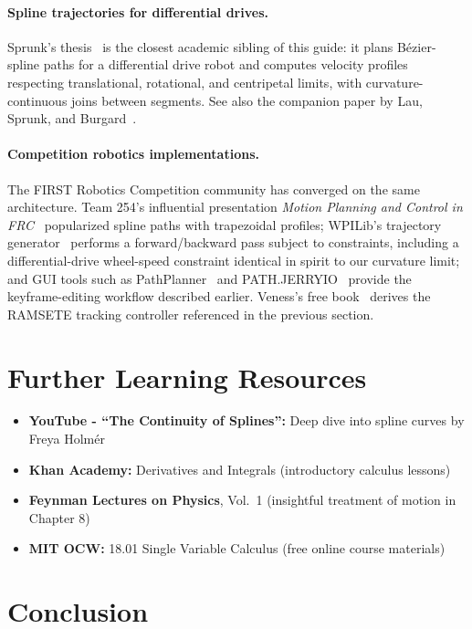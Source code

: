 \documentclass[11pt]{article}
\begin{document}
\paragraph{Spline trajectories for differential drives.} Sprunk's thesis~\cite{sprunk} is the closest academic sibling of this guide: it plans B\'ezier-spline paths for a differential drive robot and computes velocity profiles respecting translational, rotational, and centripetal limits, with curvature-continuous joins between segments. See also the companion paper by Lau, Sprunk, and Burgard~\cite{lau}.

\paragraph{Competition robotics implementations.} The FIRST Robotics Competition community has converged on the same architecture. Team 254's influential presentation \emph{Motion Planning and Control in FRC}~\cite{team254} popularized spline paths with trapezoidal profiles; WPILib's trajectory generator~\cite{wpilib} performs a forward/backward pass subject to constraints, including a differential-drive wheel-speed constraint identical in spirit to our curvature limit; and GUI tools such as PathPlanner~\cite{pathplanner} and PATH.JERRYIO~\cite{jerryio} provide the keyframe-editing workflow described earlier. Veness's free book~\cite{veness} derives the RAMSETE tracking controller referenced in the previous section.

\section{Further Learning Resources}

\begin{itemize}
  \item \textbf{YouTube - ``The Continuity of Splines'':} Deep dive into spline curves by Freya Holm\'er~\cite{holmer}
  \item \textbf{Khan Academy:} Derivatives and Integrals (introductory calculus lessons)
  \item \textbf{Feynman Lectures on Physics}, Vol.~1 (insightful treatment of motion in Chapter 8)
  \item \textbf{MIT OCW:} 18.01 Single Variable Calculus (free online course materials)
\end{itemize}

\section{Conclusion}
\end{document}
